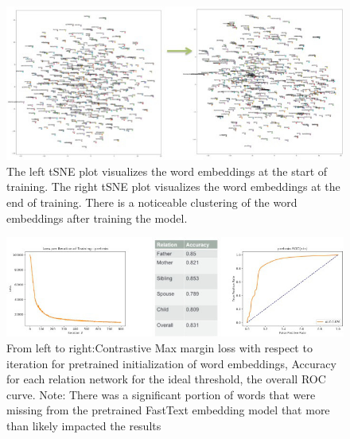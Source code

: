 \documentclass[11.5pt]{article}
\newcounter{graphics}
\begin{document}
\begin{figure}[h!]
\centerline{\includegraphics[width=1\textwidth]{report_ntn/random_init_tsne.jpg}}
  \caption{The left tSNE plot visualizes the word embeddings at the start of training. The right tSNE plot visualizes the word embeddings at the end of training. There is a noticeable clustering of the word embeddings after training the model.}
\label{random_init_tsne.jpg}
\end{figure}

\begin{figure}[h!]
\centerline{\includegraphics[width=1\textwidth]{report_ntn/pretrain_perf.jpg}}
  \caption{From left to right:Contrastive Max margin loss with respect to iteration for pretrained initialization of word embeddings, Accuracy for each relation network for the ideal threshold, the overall ROC curve. Note: There was a significant portion of words that were missing from the pretrained FastText embedding model that more than likely impacted the results}
\label{pretrain_perf.jpg}
\end{figure}
\end{document}
